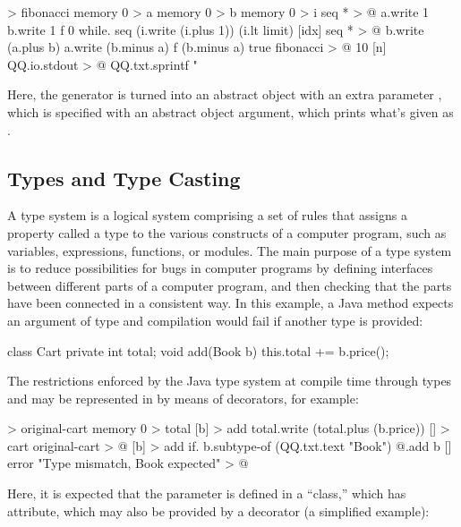 \documentclass[sigplan,nonacm]{acmart}
\begin{document}
\begin{ffcode}
[limit f] > fibonacci
  memory 0 > a
  memory 0 > b
  memory 0 > i
  seq * > @
    a.write 1
    b.write 1
    f 0
    while.
      seq (i.write (i.plus 1)) (i.lt limit)
      [idx]
        seq * > @
          b.write (a.plus b)
          a.write (b.minus a)
          f (b.minus a)
    true
fibonacci > @
  10
  [n]
    QQ.io.stdout > @
      QQ.txt.sprintf "%
\end{ffcode}

Here, the generator is turned into an abstract object  with an extra parameter , which is specified with an abstract object argument, which prints what's given as .

\subsection{Types and Type Casting}
\label{sec:types}

A type system is a logical system comprising a set of rules that assigns a property called a type to the various constructs of a computer program, such as variables, expressions, functions, or modules. The main purpose of a type system is to reduce possibilities for bugs in computer programs by defining interfaces between different parts of a computer program, and then checking that the parts have been connected in a consistent way. In this example, a Java method  expects an argument of type  and compilation would fail if another type is provided:

\begin{ffcode}
class Cart {
  private int total;
  void add(Book b) {
    this.total += b.price();
  }
}
\end{ffcode}

The restrictions enforced by the Java type system at compile time through types  and  may be represented in \eolang{} by means of decorators, for example:

\begin{ffcode}
[] > original-cart
  memory 0 > total
  [b] > add
    total.write (total.plus (b.price))
[] > cart
  original-cart > @
  [b] > add
    if.
      b.subtype-of (QQ.txt.text "Book")
      @.add b
      []
        error "Type mismatch, Book expected" > @
\end{ffcode}

Here, it is expected that the parameter  is defined in a ``class,'' which has  attribute, which may also be provided by a decorator (a simplified example):
\end{document}
